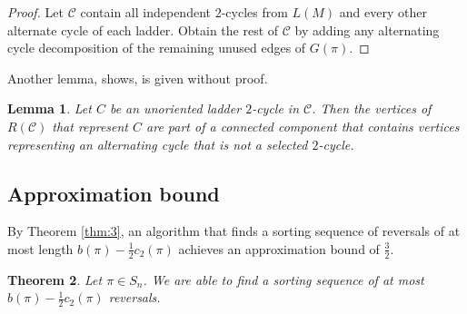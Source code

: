 \documentclass[11pt,DIV=11]{scrartcl}
\newtheorem{theorem}{Theorem}[section]
\newtheorem{lemma}[theorem]{Lemma}
\theoremstyle{definition}
\theoremstyle{remark}
\begin{document}
\begin{proof}
Let $\mathcal{C}$ contain all independent $2$-cycles from $L(M)$ and every other alternate cycle of each ladder. Obtain the rest of $\mathcal{C}$ by adding any alternating cycle decomposition of the remaining unused edges of $G(\pi)$.
\end{proof}

Another lemma, \citeauthor*{Christie1998} shows, is given without proof.

\begin{lemma}
\label{lem:10}
Let $C$ be an unoriented ladder $2$-cycle in $\mathcal{C}$. Then the vertices of $R(\mathcal{C})$ that represent $C$ are part of a connected component that contains vertices representing an alternating cycle that is not a selected $2$-cycle.
\end{lemma}

\subsection{Approximation bound}
\label{sec:approximation_bound}

By Theorem \ref{thm:3}, an algorithm that finds a sorting sequence of reversals of at most length $b(\pi) - \frac{1}{2} c_2(\pi)$ achieves an approximation bound of $\frac{3}{2}$.

\begin{theorem}
\label{thm:6}
Let $\pi \in S_n$. We are able to find a sorting sequence of at most $b(\pi) - \frac{1}{2} c_2(\pi)$ reversals.
\end{theorem}
\end{document}
